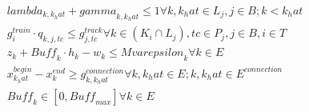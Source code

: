 \begin{align}
  & \mathit{lambda}_{k , k_hat} + \mathit{gamma}_{k , k_hat} \leq 1 \forall k , k_hat \in L_{j} , j \in B ; k < k_hat \tag{eq\_0015} \\
  & g_{i}^{t r a i n} \cdot q_{k , j , t c} \leq g_{j , t c}^{t r a c k} \forall k \in \left(K_{i} \cap L_{j}\right) , t c \in P_{j} , j \in B , i \in T \tag{eq\_0016} \\
  & z_{k} + \mathit{Buff}_{k} \cdot h_{k} - w_{k} \leq M \mathit{varepsilon}_{k} \forall k \in E \tag{eq\_0017} \\
  & x_{k_hat}^{b e g i n} - x_{k}^{e n d} \geq g_{k , k_hat}^{c o n n e c t i o n} \forall k , k_hat \in E ; k , k_hat \in E^{c o n n e c t i o n} \tag{eq\_0018} \\
  & \mathit{Buff}_{k} \in \left[0 , \mathit{Buff}_{max}\right] \forall k \in E \tag{eq\_0023} \\
\end{align}
